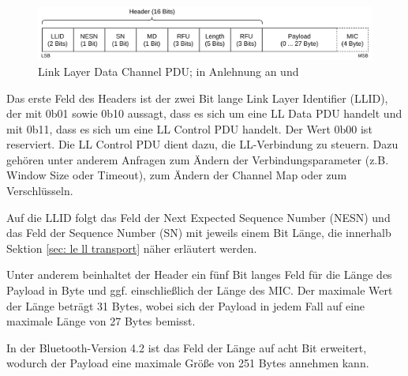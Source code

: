 \begin{figure}[H]
    \centering
    \includegraphics[width=1\textwidth]{graphics/link_layer_packetformat_pdu_data.pdf}
    \caption[Link Layer Data Channel PDU]{Link Layer Data Channel PDU; in Anlehnung an \cite{BtSpec_fig_2208a} und \cite{BtSpec_fig_2208b}}
    \label{fig: ll data channel pdu}
\end{figure}

Das erste Feld des Headers ist der zwei Bit lange Link Layer Identifier (LLID), der mit 0b01 sowie 0b10 aussagt, dass es sich um eine LL Data PDU handelt und mit 0b11, dass es sich um eine LL Control PDU handelt. Der Wert 0b00 ist reserviert. Die LL Control PDU dient dazu, die LL-Verbindung zu steuern. Dazu gehören unter anderem Anfragen zum Ändern der Verbindungsparameter (z.B. Window Size oder Timeout), zum Ändern der Channel Map oder zum Verschlüsseln.

Auf die LLID folgt das Feld der Next Expected Sequence Number (NESN) und das Feld der Sequence Number (SN) mit jeweils einem Bit Länge, die innerhalb Sektion \ref{sec: le ll transport} näher erläutert werden.

Unter anderem beinhaltet der Header ein fünf Bit langes Feld für die Länge des Payload in Byte und ggf. einschließlich der Länge des MIC. Der maximale Wert der Länge beträgt 31 Bytes, wobei sich der Payload in jedem Fall auf eine maximale Länge von 27 Bytes bemisst. \cite{BtSpec4.0_2208-2209}

In der Bluetooth-Version 4.2 ist das Feld der Länge auf acht Bit erweitert, wodurch der Payload eine maximale Größe von 251 Bytes annehmen kann. \cite{BtSpec4.2_2589-2590}